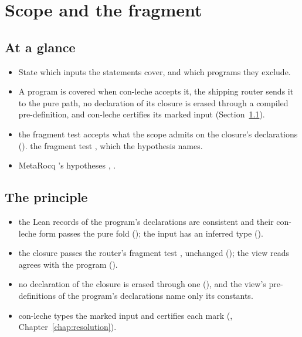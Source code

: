 \chapter{Scope and the fragment}\label{chap:scope}

\section*{At a glance}
\begin{itemize}
\item {} State which  inputs the statements cover, and which programs they
  exclude.
\item {} A program is covered when con-leche accepts it, the shipping router sends
  it to the pure path, no declaration of its closure is erased through a compiled
  pre-definition, and con-leche certifies its marked input (Section~\ref{sec:scope-principle}).
\item {} \stProved{} the fragment test accepts what the scope admits on the closure's declarations (). \stShipping{} the fragment test
  , which the hypothesis  names.
\item {} MetaRocq 's hypotheses ,
  .
\end{itemize}

\section{The principle}\label{sec:scope-principle}

\begin{itemize}
\item {} the Lean records of the program's declarations are consistent
  and their con-leche form passes the pure fold (); the input has an inferred type
  ().
\item {} the closure passes the router's fragment test ,
  unchanged (); the view  reads agrees with the program ().
\item {} no declaration of the closure is erased through one
  (), and the view's pre-definitions of the program's declarations name only its
  constants.
\item {} con-leche types the marked input and certifies each mark
  (, Chapter~\ref{chap:resolution}).
\end{itemize}

